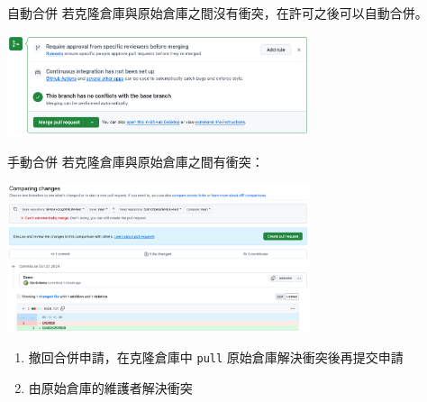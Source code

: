 \documentclass[xetex, unicode, 10pt, aspectratio=169]{beamer}
\begin{document}
\begin{frame}{自動合併}
    若克隆倉庫與原始倉庫之間沒有衝突，在許可之後可以自動合併。
    \begin{center}
        \includegraphics[width=3.5in]{./img/github-merge-pull-request-automatically.png}
    \end{center}
\end{frame}

\begin{frame}{手動合併}
    若克隆倉庫與原始倉庫之間有衝突：
    \begin{center}
        \includegraphics[width=3.5in]{./img/github-pull-request-with-conflicts.png}
    \end{center}
    \pause

    \begin{enumerate}
        \item 撤回合併申請，在克隆倉庫中 \texttt{pull} 原始倉庫解決衝突後再提交申請
        \item 由原始倉庫的維護者解決衝突
    \end{enumerate}
\end{frame}
\end{document}
